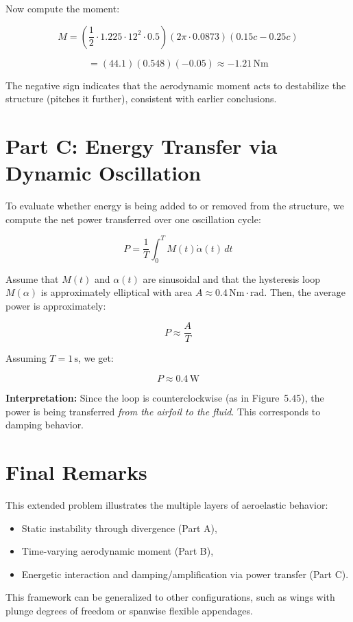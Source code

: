 \documentclass{article}
\begin{document}
Now compute the moment:

\[
M = \left( \frac{1}{2} \cdot 1.225 \cdot 12^2 \cdot 0.5 \right)(2\pi \cdot 0.0873)(0.15c - 0.25c)
\]

\[
= (44.1)(0.548)(-0.05) \approx -1.21 \, \text{Nm}
\]

The negative sign indicates that the aerodynamic moment acts to destabilize the structure (pitches it further), consistent with earlier conclusions.

\section*{Part C: Energy Transfer via Dynamic Oscillation}

To evaluate whether energy is being added to or removed from the structure, we compute the net power transferred over one oscillation cycle:

\[
P = \frac{1}{T} \int_0^T M(t) \dot{\alpha}(t) \, dt
\]

Assume that \( M(t) \) and \( \alpha(t) \) are sinusoidal and that the hysteresis loop \( M(\alpha) \) is approximately elliptical with area \( A \approx 0.4 \, \text{Nm} \cdot \text{rad} \). Then, the average power is approximately:

\[
P \approx \frac{A}{T}
\]

Assuming \( T = 1 \, \text{s} \), we get:

\[
P \approx 0.4 \, \text{W}
\]

\textbf{Interpretation:} Since the loop is counterclockwise (as in Figure~5.45), the power is being transferred \textit{from the airfoil to the fluid}. This corresponds to damping behavior.

\section*{Final Remarks}

This extended problem illustrates the multiple layers of aeroelastic behavior:
\begin{itemize}
    \item Static instability through divergence (Part A),
    \item Time-varying aerodynamic moment (Part B),
    \item Energetic interaction and damping/amplification via power transfer (Part C).
\end{itemize}

This framework can be generalized to other configurations, such as wings with plunge degrees of freedom or spanwise flexible appendages.
\end{document}
